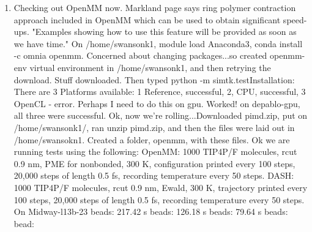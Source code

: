 \documentclass[12pt,reqno]{amsart}
\numberwithin{equation}{section}
\begin{document}
\begin{enumerate}
\item Checking out OpenMM now. Markland page says ring polymer contraction approach included in OpenMM which can be used to obtain significant speed-ups.  "Examples showing how to use this feature will be provided as soon as we have time."  On /home/swansonk1, module load Anaconda3, conda install -c omnia openmm.  Concerned about changing packages...so created openmm-env virtual environment in /home/swansonk1, and then retrying the download.  Stuff downloaded. Then typed python -m simtk.testInstallation: There are 3 Platforms available: 1 Reference, successful, 2, CPU, successful, 3 OpenCL - error.  Perhaps I need to do this on gpu.  Worked!  on depablo-gpu, all three were successful.  Ok, now we're rolling...Downloaded pimd.zip, put on /home/swansonk1/, ran unzip pimd.zip, and then the files were laid out in /home/swansokn1.  Created a folder, openmm, with these files.  Ok we are running tests using the following: OpenMM: 1000 TIP4P/F molecules, rcut 0.9 nm, PME for nonbonded, 300 K, configuration printed every 100 steps, 20,000 steps of length 0.5 fs, recording temperature every 50 steps.  DASH: 1000 TIP4P/F molecules, rcut 0.9 nm, Ewald, 300 K, trajectory printed every 100 steps, 20,000 steps of length 0.5 fs, recording temperature every 50 steps.  
\subitem On Midway-l13b-23
 beads: 217.42 s
 beads: 126.18 s
 beads: 79.64 s
 beads: 
 bead: 



\end{enumerate}
\end{document}
